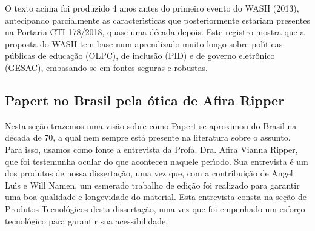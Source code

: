 \documentclass[
12pt,		%
openright,	%
twoside,  %
a4paper,			%
chapter=TITLE,		%
english,			%
french,				%
spanish,			%
brazil				%
]{USPSC-classe/USPSC}
\begin{document}
\noindent\begin{center}\mbox{\centering{}}\end{center}


O texto acima foi produzido 4 anos antes do primeiro evento do WASH (2013), antecipando parcialmente as caracter\'{\i}sticas que posteriormente estariam presentes na Portaria CTI 178/2018, quase uma d\'ecada depois. Este registro mostra que a proposta do WASH tem base num aprendizado muito longo sobre pol\'{\i}ticas p\'ublicas de educa\c{c}\~ao (OLPC), de inclus\~ao (PID) e de governo eletr\^onico (GESAC), embasando-se em fontes seguras e robustas.









\subsection[Papert no Brasil pela \'otica de Afira Ripper]{Papert no Brasil pela \'otica de Afira Ripper}\label{Papert no Brasil pela \'otica de Afira Ripper}
Nesta se\c{c}\~ao trazemos uma vis\~ao sobre como Papert se aproximou do Brasil na d\'ecada de 70, a qual nem sempre est\'a presente na literatura sobre o assunto. Para isso, usamos como fonte a entrevista da Profa. Dra. Afira Vianna Ripper, que foi testemunha ocular do que aconteceu naquele per\'{\i}odo. Sua entrevista \'e um dos produtos de nossa disserta\c{c}\~ao, uma vez que, com a contribui\c{c}\~ao de Angel Lu\'{\i}s e Will Namen, um esmerado trabalho de edi\c{c}\~ao foi realizado para garantir uma boa qualidade e longevidade do material. Esta entrevista consta na se\c{c}\~ao de Produtos Tecnol\'ogicos desta disserta\c{c}\~ao, uma vez que foi empenhado um esfor\c{c}o tecnol\'ogico para garantir sua acessibilidade.
\end{document}
